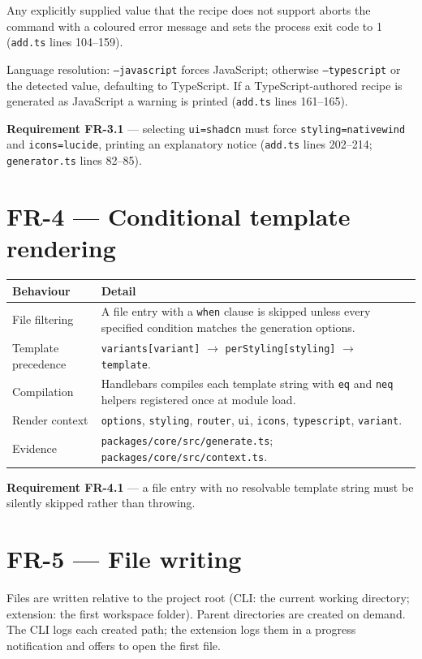 Any explicitly supplied value that the recipe does not support aborts the command
with a coloured error message and sets the process exit code to 1
(\texttt{add.ts} lines 104--159).

Language resolution: \texttt{--javascript} forces JavaScript;
otherwise \texttt{--typescript} or the detected value, defaulting to
TypeScript. If a TypeScript-authored recipe is generated as JavaScript a warning
is printed (\texttt{add.ts} lines 161--165).

\textbf{Requirement FR-3.1} --- selecting \texttt{ui=shadcn} must force
\texttt{styling=nativewind} and \texttt{icons=lucide}, printing an explanatory
notice (\texttt{add.ts} lines 202--214; \texttt{generator.ts} lines 82--85).

\section{FR-4 --- Conditional template rendering}

\begin{longtable}{p{4.4cm}p{9.6cm}}
\toprule
\textbf{Behaviour} & \textbf{Detail} \\
\midrule
\endhead
File filtering & A file entry with a \texttt{when} clause is skipped unless every
specified condition matches the generation options. \\
Template precedence & \texttt{variants[variant]} $\rightarrow$
\texttt{perStyling[styling]} $\rightarrow$ \texttt{template}. \\
Compilation & Handlebars compiles each template string with \texttt{eq} and
\texttt{neq} helpers registered once at module load. \\
Render context & \texttt{options}, \texttt{styling}, \texttt{router}, \texttt{ui},
\texttt{icons}, \texttt{typescript}, \texttt{variant}. \\
Evidence & \texttt{packages/core/src/generate.ts};
\texttt{packages/core/src/context.ts}. \\
\bottomrule
\end{longtable}

\textbf{Requirement FR-4.1} --- a file entry with no resolvable template string
must be silently skipped rather than throwing.

\section{FR-5 --- File writing}

Files are written relative to the project root (CLI: the current working
directory; extension: the first workspace folder). Parent directories are created
on demand. The CLI logs each created path; the extension logs them in a progress
notification and offers to open the first file.

